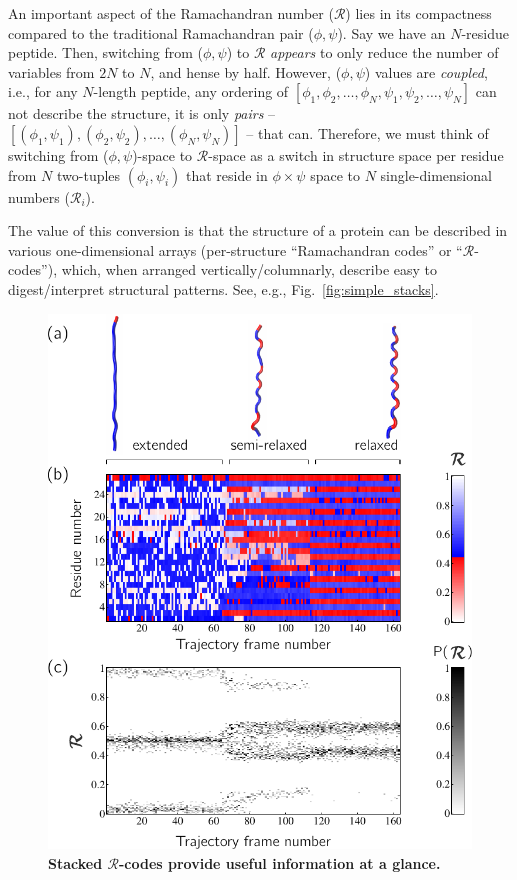 \documentclass[fleqn,10pt,lineno]{wlpeerj} %
\newcommand{\Fig}[1]{Fig.~\ref{#1}}
\begin{document}
An important aspect of the Ramachandran number ($\mathcal{R}$) lies in its compactness compared to the traditional Ramachandran pair ($\phi,\psi$). Say we have an $N$-residue peptide. Then, switching from ($\phi,\psi$) to $\mathcal{R}$ \textit{appears} to only reduce the number of variables from $2N$ to $N$, and hense by half. However, ($\phi,\psi$) values are {\it coupled}, i.e., for any $N$-length peptide, any ordering of $[\phi_1,\phi_2,\ldots,\phi_N,\psi_1,\psi_2,\ldots,\psi_N]$ can not describe the structure, it is only \textit{pairs} -- $[(\phi_1,\psi_1),(\phi_2,\psi_2),\ldots,(\phi_N,\psi_N)]$ -- that can. Therefore, we must think of switching from ($\phi,\psi$)-space to $\mathcal{R}$-space as a switch in structure space per residue from $N$ two-tuples $(\phi_i,\psi_i)$ that reside in $\phi\times\psi$ space to $N$ single-dimensional numbers ($\mathcal{R}_i$).

The value of this conversion is that the structure of a protein can be described in various one-dimensional arrays (per-structure ``Ramachandran codes'' or ``$\mathcal{R}$-codes''), which, when arranged vertically/columnarly, describe easy to digest/interpret structural patterns. See, e.g., \Fig{fig:simple_stacks}. 

\begin{figure}[t!]
\centering
\includegraphics[width=0.65\linewidth]{figures/nano_r_demo.pdf}
\caption{\textbf{Stacked $\mathcal{R}$-codes provide useful information at a glance.} \label{fig:complex_stacks}} 
\end{figure}
\end{document}

